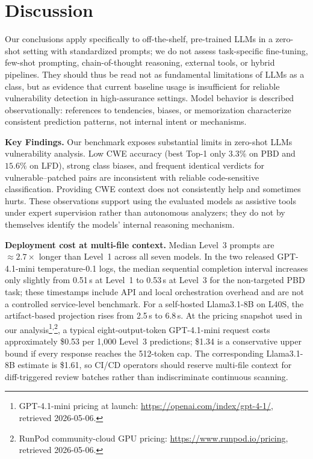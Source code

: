\documentclass[lettersize,journal]{IEEEtran}
\begin{document}
\section{Discussion}
\label{section:discussion}

Our conclusions apply specifically to off-the-shelf, pre-trained LLMs in a zero-shot setting with standardized prompts; we do not assess task-specific fine-tuning, few-shot prompting, chain-of-thought reasoning, external tools, or hybrid pipelines. They should thus be read not as fundamental limitations of LLMs as a class, but as evidence that current baseline usage is insufficient for reliable vulnerability detection in high-assurance settings. Model behavior is described observationally: references to tendencies, biases, or memorization characterize consistent prediction patterns, not internal intent or mechanisms.

\textbf{Key Findings.} Our benchmark exposes substantial limits in zero-shot \glspl{LLM} vulnerability analysis. Low \gls{CWE} accuracy (best Top-1 only $3.3\%$ on PBD and $15.6\%$ on LFD), strong class biases, and frequent identical verdicts for vulnerable--patched pairs are inconsistent with reliable code-sensitive classification. Providing \gls{CWE} context does not consistently help and sometimes hurts. These observations support using the evaluated models as assistive tools under expert supervision rather than autonomous analyzers; they do not by themselves identify the models' internal reasoning mechanism.


\textbf{Deployment cost at multi-file context.} Median Level~3 prompts are $\approx 2.7\times$ longer than Level~1 across all seven models. In the two released GPT-4.1-mini temperature-0.1 logs, the median sequential completion interval increases only slightly from 0.51\,s at Level~1 to 0.53\,s at Level~3 for the non-targeted PBD task; these timestamps include API and local orchestration overhead and are not a controlled service-level benchmark. For a self-hosted Llama3.1-8B on L40S, the artifact-based projection rises from 2.5\,s to 6.8\,s. At the pricing snapshot used in our analysis\footnote{GPT-4.1-mini pricing at launch: \url{https://openai.com/index/gpt-4-1/}, retrieved 2026-05-06.}\textsuperscript{,}\footnote{RunPod community-cloud GPU pricing: \url{https://www.runpod.io/pricing}, retrieved 2026-05-06.}, a typical eight-output-token GPT-4.1-mini request costs approximately \$0.53 per 1{,}000 Level~3 predictions; \$1.34 is a conservative upper bound if every response reaches the 512-token cap. The corresponding Llama3.1-8B estimate is \$1.61, so CI/CD operators should reserve multi-file context for diff-triggered review batches rather than indiscriminate continuous scanning.
\end{document}
